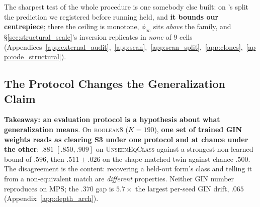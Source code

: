 \noindent The sharpest test of the whole procedure is one somebody else built: on \citet{lake2018generalization}'s split the prediction we registered before running held, and \textbf{it bounds our centrepiece}; there the ceiling is monotone, $\phi_\infty$ sits \emph{above} the family, and \S\ref{sec:structural_scale}'s inversion replicates in \emph{none} of $9$ cells (Appendices~\ref{app:external_audit},~\ref{app:scan},~\ref{app:scan_split},~\ref{app:clones},~\ref{app:code_structural}).

\subsection{The Protocol Changes the Generalization Claim}
\label{sec:protocol_disagreement}


\textbf{Takeaway: an evaluation protocol is a hypothesis about what generalization means}. On \textsc{boolean8} ($K{=}190$), \textbf{one set of trained GIN weights reads as clearing S3 under one protocol and at chance under the other}: $\mathbf{.881}$ $[.850,.909]$ on \textsc{UnseenEqClass} against a strongest-non-learned bound of $.596$, then $\mathbf{.511}{\pm}.026$ on the shape-matched twin against chance $.500$. The disagreement is the content: recovering a held-out form's class and telling it from a non-equivalent match are \emph{different} properties. Neither GIN number reproduces on MPS; the $.370$ gap is $5.7\times$ the largest per-seed GIN drift, $.065$ (Appendix~\ref{app:depth_arch}). %
%
